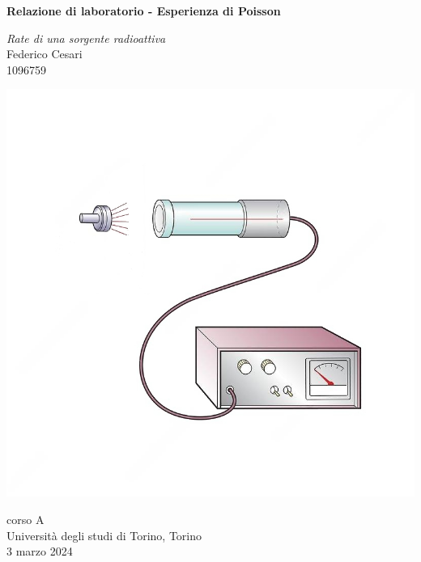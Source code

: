 \begin{titlepage}
   \begin{center}
       \vspace*{1cm}
        
       \textbf{\LARGE Relazione di laboratorio - Esperienza di Poisson}
       
       \vspace{0.3cm}
       \large \textit{Rate di una sorgente radioattiva} \\
       
       \vspace{0.5cm}
       \Large Federico Cesari \\
       
       \small 1096759

			
		\vspace{1cm}
		\begin{center}
			\includegraphics[scale=1.2]{geiger.jpeg}	
		\end{center}
		
		

       \vfill
            
       
            
       \vspace{0.8cm}
     
       
            
       corso A\\
       Università degli studi di Torino, Torino\\
       3 marzo 2024\\
       
            
   \end{center}
\end{titlepage}
